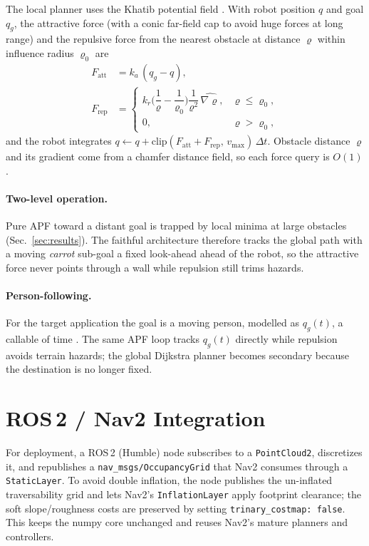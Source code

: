 \documentclass[11pt]{article}
\begin{document}
The local planner uses the Khatib potential field \cite{khatib1986}. With robot
position $q$ and goal $q_g$, the attractive force (with a conic far-field cap to
avoid huge forces at long range) and the repulsive force from the nearest obstacle
at distance $\varrho$ within influence radius $\varrho_0$ are
\begin{align}
F_{\text{att}} &= k_a\,(q_g - q), \label{eq:fatt}\\
F_{\text{rep}} &=
\begin{cases}
k_r\Big(\dfrac{1}{\varrho}-\dfrac{1}{\varrho_0}\Big)\dfrac{1}{\varrho^2}\,\widehat{\nabla\varrho}, & \varrho \le \varrho_0,\\[6pt]
0, & \varrho > \varrho_0,
\end{cases}
\label{eq:frep}
\end{align}
and the robot integrates $q \leftarrow q + \mathrm{clip}(F_{\text{att}}+F_{\text{rep}},\,v_{\max})\,\Delta t$.
Obstacle distance $\varrho$ and its gradient come from a chamfer distance field, so
each force query is $O(1)$.

\paragraph{Two-level operation.} Pure APF toward a distant goal is trapped by
local minima at large obstacles (Sec.~\ref{sec:results}). The faithful
architecture therefore tracks the global path with a moving \emph{carrot} sub-goal
a fixed look-ahead ahead of the robot, so the attractive force never points
through a wall while repulsion still trims hazards.

\paragraph{Person-following.} For the target application the goal is a moving
person, modelled as $q_g(t)$, a callable of time \cite{islam2019}. The same APF
loop tracks $q_g(t)$ directly while repulsion avoids terrain hazards; the global
Dijkstra planner becomes secondary because the destination is no longer fixed.

\section{ROS\,2 / Nav2 Integration}
\label{sec:nav2}

For deployment, a ROS\,2 (Humble) node subscribes to a \texttt{PointCloud2},
discretizes it, and republishes a \texttt{nav\_msgs/OccupancyGrid} that Nav2
\cite{macenski2020,macenski2022} consumes through a \texttt{StaticLayer}. To avoid
double inflation, the node publishes the un-inflated traversability grid and lets
Nav2's \texttt{InflationLayer} apply footprint clearance; the soft slope/roughness
costs are preserved by setting \texttt{trinary\_costmap:\,false}. This keeps the
numpy core unchanged and reuses Nav2's mature planners and controllers.
\end{document}
